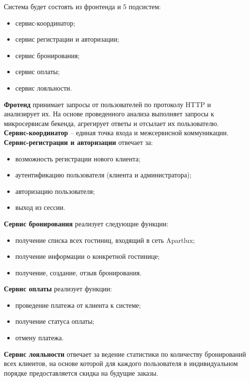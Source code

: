\pagebreak
%
Система будет состоять из фронтенда и 5 подсистем:
\begin{itemize}
	\item сервис-координатор;
	
	\item сервис регистрации и авторизации;
	
	\item сервис бронирования;
	
	\item сервис оплаты;
	
	\item сервис лояльности.
\end{itemize}
%
\textbf{Фротенд} принимает запросы от пользователей по протоколу HTTP и анализирует их. На основе проведенного анализа выполняет запросы к микросервисам бекенда, агрегирует ответы и отсылает их пользователю. \\
\textbf{Сервис-координатор} -- единая точка входа и межсервисной коммуникации. \\
\textbf{Сервис-регистрации и авторизации} отвечает за:
\begin{itemize}
	\item возможность регистрации нового клиента;
	
	\item аутентификацию пользователя (клиента и администратора);
	
	\item авторизацию пользователя;
	
	\item выход из сессии.
\end{itemize}
\textbf{Сервис бронирования} реализует следующие функции:
\begin{itemize}
	\item получение списка всех гостиниц, входящий в сеть Apartlux;
	
	\item получение информации о конкретной гостинице;
	
	\item получение, создание, отзыв бронирования.
\end{itemize}
\textbf{Сервис оплаты} реализует функции:
\begin{itemize}
	\item проведение платежа от клиента к системе;
	
	\item получение статуса оплаты;
	
	\item отмену платежа.
\end{itemize}
\textbf{Сервис лояльности} отвечает за ведение статистики по количеству бронирований всех клиентов, на основе которой для каждого пользователя в индивидуальном порядке предоставляется скидка на будущие заказы.

